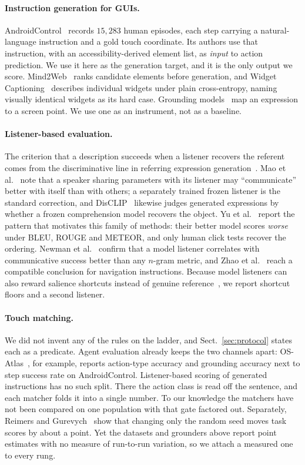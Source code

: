 \documentclass[runningheads,a4paper]{llncs}
\begin{document}
\paragraph{Instruction generation for GUIs.}
AndroidControl~\cite{androidcontrol} records $15{,}283$ human episodes, each step carrying a
natural-language instruction and a gold touch coordinate. Its authors use that instruction, with
an accessibility-derived element list, as \emph{input} to action prediction. We use it here as
the generation target, and it is the only output we score. Mind2Web~\cite{mind2web} ranks candidate elements
before generation, and Widget Captioning~\cite{widgetcap} describes individual widgets under
plain cross-entropy, naming visually identical widgets as its hard case. Grounding
models~\cite{seeclick,osatlas,uground} map an expression to a screen point. We use one as an
instrument, not as a baseline.

\paragraph{Listener-based evaluation.}
The criterion that a description succeeds when a listener recovers the referent comes from the
discriminative line in referring expression generation~\cite{mao2016,luo2017,yu2016}. Mao et
al.~\cite{mao2016} note that a speaker sharing parameters with its listener may ``communicate''
better with itself than with others; a separately trained frozen listener is the standard
correction, and DisCLIP~\cite{disclip} likewise judges generated expressions by whether a frozen
comprehension model recovers the object. Yu et al.~\cite{yu2016} report the pattern that motivates this family of
methods: their better model scores \emph{worse} under BLEU, ROUGE and METEOR, and only human click
tests recover the ordering. Newman et al.~\cite{newman2020} confirm that a model listener
correlates with communicative success better than any $n$-gram metric, and Zhao et
al.~\cite{zhao2021} reach a compatible conclusion for navigation instructions. Because model
listeners can also reward salience shortcuts instead of genuine reference~\cite{refoi}, we
report shortcut floors and a second listener.

\paragraph{Touch matching.}
We did not invent any of the rules on the ladder, and Sect.~\ref{sec:protocol} states each as a
predicate. Agent evaluation already keeps the two channels apart: OS-Atlas~\cite{osatlas}, for
example, reports action-type accuracy and grounding accuracy next to step success rate on
AndroidControl. Listener-based scoring of generated instructions has no such split. There the
action class is read off the sentence, and each matcher folds it into a single number. To our
knowledge the matchers have not been compared on one population with that gate factored out. Separately, Reimers and Gurevych~\cite{reimers2017} show that changing only the
random seed moves task scores by about a point. Yet the datasets and grounders above report point
estimates with no measure of run-to-run variation, so we attach a measured one to every rung.
\end{document}
